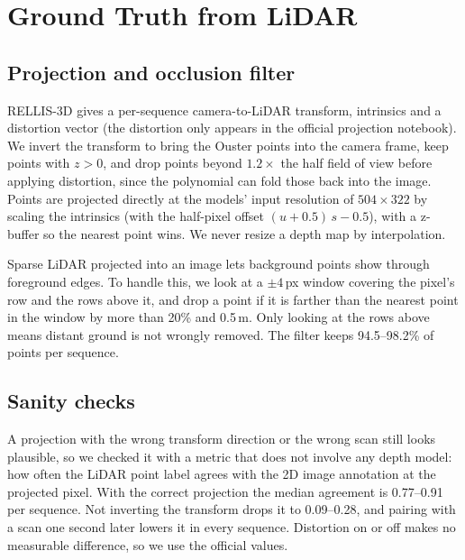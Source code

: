 \documentclass[conference]{IEEEtran}
\begin{document}
\section{Ground Truth from LiDAR}\label{sec:gt}

\subsection{Projection and occlusion filter}
RELLIS-3D gives a per-sequence camera-to-LiDAR transform, intrinsics and a distortion vector (the distortion only appears in the official projection notebook). We invert the transform to bring the Ouster points into the camera frame, keep points with $z>0$, and drop points beyond $1.2\times$ the half field of view before applying distortion, since the polynomial can fold those back into the image. Points are projected directly at the models' input resolution of $504\times322$ by scaling the intrinsics (with the half-pixel offset $(u+0.5)\,s-0.5$), with a z-buffer so the nearest point wins. We never resize a depth map by interpolation.

Sparse LiDAR projected into an image lets background points show through foreground edges. To handle this, we look at a $\pm4$\,px window covering the pixel's row and the rows above it, and drop a point if it is farther than the nearest point in the window by more than 20\% and 0.5\,m. Only looking at the rows above means distant ground is not wrongly removed. The filter keeps 94.5--98.2\% of points per sequence.

\subsection{Sanity checks}
A projection with the wrong transform direction or the wrong scan still looks plausible, so we checked it with a metric that does not involve any depth model: how often the LiDAR point label agrees with the 2D image annotation at the projected pixel. With the correct projection the median agreement is 0.77--0.91 per sequence. Not inverting the transform drops it to 0.09--0.28, and pairing with a scan one second later lowers it in every sequence. Distortion on or off makes no measurable difference, so we use the official values.
\end{document}
